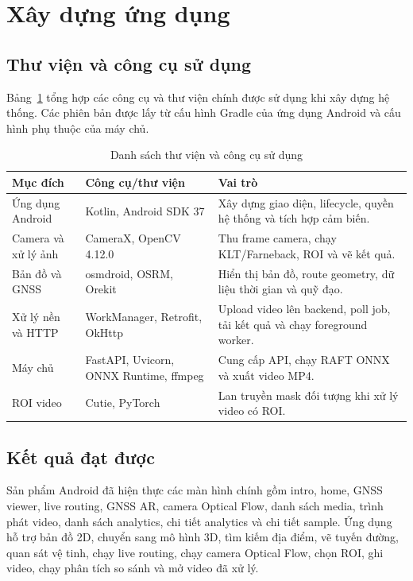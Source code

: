 \documentclass[../DoAn.tex]{subfiles}
\begin{document}
\FloatBarrier
\section{Xây dựng ứng dụng}
\label{section:4.3}
\subsection{Thư viện và công cụ sử dụng}
\label{subsection:4.3.1}
Bảng~\ref{table:build-tools} tổng hợp các công cụ và thư viện chính được sử dụng khi xây dựng hệ thống. Các phiên bản được lấy từ cấu hình Gradle của ứng dụng Android và cấu hình phụ thuộc của máy chủ.

\begin{table}[H]
\centering
\begin{tabular}{|p{3.4cm}|p{4.2cm}|p{5.2cm}|}
\hline
\textbf{Mục đích} & \textbf{Công cụ/thư viện} & \textbf{Vai trò} \\ \hline
Ứng dụng Android & Kotlin, Android SDK 37 & Xây dựng giao diện, lifecycle, quyền hệ thống và tích hợp cảm biến. \\ \hline
Camera và xử lý ảnh & CameraX, OpenCV 4.12.0 & Thu frame camera, chạy KLT/Farneback, ROI và vẽ kết quả. \\ \hline
Bản đồ và GNSS & osmdroid, OSRM, Orekit & Hiển thị bản đồ, route geometry, dữ liệu thời gian và quỹ đạo. \\ \hline
Xử lý nền và HTTP & WorkManager, Retrofit, OkHttp & Upload video lên backend, poll job, tải kết quả và chạy foreground worker. \\ \hline
Máy chủ & FastAPI, Uvicorn, ONNX Runtime, ffmpeg & Cung cấp API, chạy RAFT ONNX và xuất video MP4. \\ \hline
ROI video & Cutie, PyTorch & Lan truyền mask đối tượng khi xử lý video có ROI. \\ \hline
\end{tabular}
\caption{Danh sách thư viện và công cụ sử dụng}
\label{table:build-tools}
\end{table}

\subsection{Kết quả đạt được}
\label{subsection:4.3.2}
Sản phẩm Android đã hiện thực các màn hình chính gồm intro, home, GNSS viewer, live routing, GNSS AR, camera Optical Flow, danh sách media, trình phát video, danh sách analytics, chi tiết analytics và chi tiết sample. Ứng dụng hỗ trợ bản đồ 2D, chuyển sang mô hình 3D, tìm kiếm địa điểm, vẽ tuyến đường, quan sát vệ tinh, chạy live routing, chạy camera Optical Flow, chọn ROI, ghi video, chạy phân tích so sánh và mở video đã xử lý.
\end{document}

